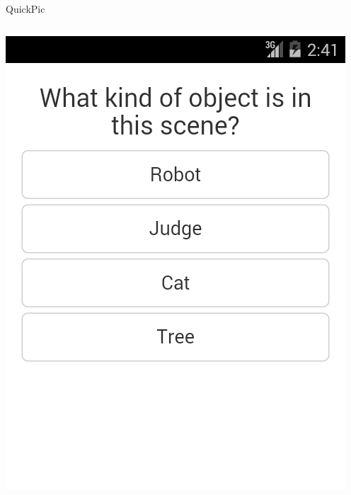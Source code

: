\documentclass[aspectratio=169]{beamer}
\begin{document}
\begin{frame}{QuickPic}
\begin{columns}[c]
\begin{column}{0.3\columnwidth}
      \includegraphics[width=\textwidth,height=\textheight,keepaspectratio]{ss_quickpic_options}
    \end{column}
    \begin{column}{0.3\columnwidth}
      \centering

\end{column}
\end{columns}
\end{frame}
\end{document}
